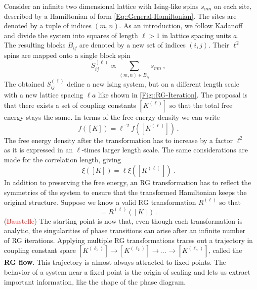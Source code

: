 	Consider an infinite two dimensional lattice with Ising-like spins $s_{mn}$ on each site, described by a Hamiltonian of form \eqref{Eq::General-Hamiltonian}. The sites are denoted by a tuple of indices $(m,n)$. As an introduction, we follow Kadanoff \cite{kadanoff1966scaling} and divide the system into squares of length $\ell >	1$ in lattice spacing units $a$. The resulting blocks $B_{ij}$ are denoted by a new set of indices $(i,j)$. Their $\ell^2$ spins are mapped onto a single block spin
	\begin{equation}
		S^{(\ell)}_{ij} \propto	\sum_{(m,n) \in  B_{ij}} s_{mn} ~,
	\end{equation}
	The obtained $S_{ij}^{(\ell)}$ define a new Ising system, but on a different length scale with a new lattice spacing $\ell a$ like shown in \autoref{Fig::RG-Iteration}. The proposal is that there exists a set of coupling constants $[K^{(\ell)}]$ so that the total free energy stays the same. In terms of the free energy density we can write
	\begin{equation} \label{free-energy-density}
		f\left([K]\right) =	\ell^{-2} f\left([K^{(\ell)}]\right)~.
	\end{equation}
	The free energy density after the transformation has to increase by a factor $\ell^2$ as it is expressed in an $\ell$-times larger length scale. The same considerations are made for the correlation length, giving
	\begin{equation}
		\xi\left([K]\right) = \ell \xi\left([K^{(\ell)}]\right)~.
	\end{equation}
	In addition to preserving the free energy, an RG transformation has to reflect the symmetries of the system to ensure that the transformed Hamiltonian keeps the original structure. Suppose we know a valid RG transformation $R^{(\ell)}$ so that
	\begin{equation}
		[K^{(\ell)}] =	R^{(\ell)}([K])~.
	\end{equation}
	 (\textcolor{red}{Baustelle})  The starting point is now that, even though each transformation is analytic,
	the singularities of phase transitions can arise after an infinite number of RG iterations. Applying multiple RG transformations traces out a trajectory in coupling constant space $[K^{(\ell_1)}] \rightarrow [K^{(\ell_2)}]  \rightarrow ... \rightarrow [K^{(\ell_n)}]$, called the \textbf{RG flow}. This trajectory is almost always attracted to fixed points. The behavior of a system near a fixed point is the origin of scaling and lets us extract important information, like the shape of the phase diagram.
	
